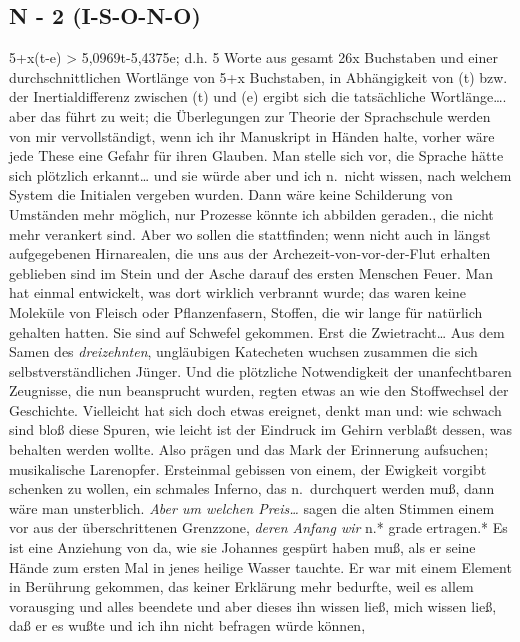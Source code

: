 \documentclass[
]{article}
\author{}
\date{\vspace{-2.5em}}
\begin{document}
\subsection{N - 2 (I-S-O-N-O)}\label{n---2-i-s-o-n-o}

5+x(t-e) \textgreater{} 5,0969t-5,4375e; d.h. 5 Worte aus gesamt 26x
Buchstaben und einer durchschnittlichen Wortlänge von 5+x Buchstaben, in
Abhängigkeit von (t) bzw. der Inertialdifferenz zwischen (t) und (e)
ergibt sich die tatsächliche Wortlänge\ldots. aber das führt zu weit;
die Überlegungen zur Theorie der Sprachschule werden von mir
vervollständigt, wenn ich ihr Manuskript in Händen halte, vorher wäre
jede These eine Gefahr für ihren Glauben. Man stelle sich vor, die
Sprache hätte sich plötzlich erkannt\ldots{} und sie würde aber und ich
n.~nicht wissen, nach welchem System die Initialen vergeben wurden. Dann
wäre keine Schilderung von Umständen mehr möglich, nur Prozesse könnte
ich abbilden geraden., die nicht mehr verankert sind. Aber wo sollen die
stattfinden; wenn nicht auch in längst aufgegebenen Hirnarealen, die uns
aus der Archezeit-von-vor-der-Flut erhalten geblieben sind im Stein und
der Asche darauf des ersten Menschen Feuer. Man hat einmal entwickelt,
was dort wirklich verbrannt wurde; das waren keine Moleküle von Fleisch
oder Pflanzenfasern, Stoffen, die wir lange für natürlich gehalten
hatten. Sie sind auf Schwefel gekommen. Erst die Zwietracht\ldots{} Aus
dem Samen des \emph{dreizehnten}, ungläubigen Katecheten wuchsen
zusammen die sich selbstverständlichen Jünger. Und die plötzliche
Notwendigkeit der unanfechtbaren Zeugnisse, die nun beansprucht wurden,
regten etwas an wie den Stoffwechsel der Geschichte. Vielleicht hat sich
doch etwas ereignet, denkt man und: wie schwach sind bloß diese Spuren,
wie leicht ist der Eindruck im Gehirn verblaßt dessen, was behalten
werden wollte. Also prägen und das Mark der Erinnerung aufsuchen;
musikalische Larenopfer. Ersteinmal gebissen von einem, der Ewigkeit
vorgibt schenken zu wollen, ein schmales Inferno, das n.~durchquert
werden muß, dann wäre man unsterblich. \emph{Aber um welchen
Preis\ldots{}} sagen die alten Stimmen einem vor aus der überschrittenen
Grenzzone, \emph{deren Anfang wir }n.* grade ertragen.* Es ist eine
Anziehung von da, wie sie Johannes gespürt haben muß, als er seine Hände
zum ersten Mal in jenes heilige Wasser tauchte. Er war mit einem Element
in Berührung gekommen, das keiner Erklärung mehr bedurfte, weil es allem
vorausging und alles beendete und aber dieses ihn wissen ließ, mich
wissen ließ, daß er es wußte und ich ihn nicht befragen würde können,
\end{document}
